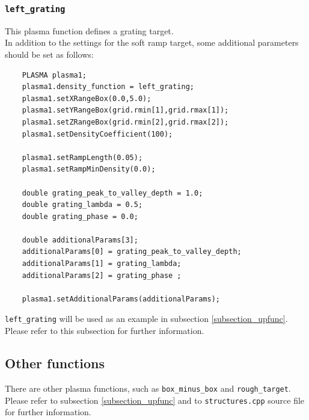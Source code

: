 \documentclass[11pt,a4paper]{report}
\begin{document}
\subsubsection{\texttt{left\_grating}}
This plasma function defines a grating target.\\
In addition to the settings for the soft ramp target, some additional parameters should be set as follows:
\begin{lstlisting}
	PLASMA plasma1;
	plasma1.density_function = left_grating;      
	plasma1.setXRangeBox(0.0,5.0);    
	plasma1.setYRangeBox(grid.rmin[1],grid.rmax[1]);                 
	plasma1.setZRangeBox(grid.rmin[2],grid.rmax[2]);
	plasma1.setDensityCoefficient(100);

	plasma1.setRampLength(0.05);
	plasma1.setRampMinDensity(0.0);
	     
	double grating_peak_to_valley_depth = 1.0;
	double grating_lambda = 0.5;
	double grating_phase = 0.0;
    
	double additionalParams[3];
	additionalParams[0] = grating_peak_to_valley_depth;
	additionalParams[1] = grating_lambda;
	additionalParams[2] = grating_phase ;
    
	plasma1.setAdditionalParams(additionalParams);
\end{lstlisting}
\verb+left_grating+ will be used as an example in subsection \ref{subsection_upfunc}. Please refer to this subsection for further information.
\subsection{Other functions}
There are other plasma functions, such as \texttt{box\_minus\_box} and \texttt{rough\_target}. Please refer to subsection \ref{subsection_upfunc} and to \verb+structures.cpp+ source file for further information.
\end{document}
